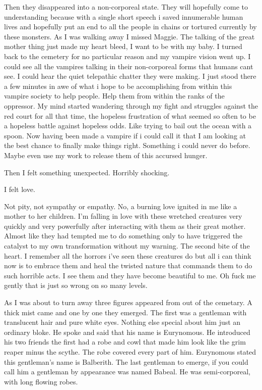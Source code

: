 Then they disappeared into a non-corporeal state. They will hopefully come to understanding because with a single short speech i saved innumerable human lives and hopefully put an end to all the people in chains or tortured currently by these monsters. As I was walking away I missed Maggie. The talking of the great mother thing just made my heart bleed, I want to be with my baby. I turned back to the cemetery for no particular reason and my vampire vision went up. I could see all the vampires talking in their non-corporeal forms that humans cant see. I could hear the quiet telepathic chatter they were making. I just stood there a few minutes in awe of what i hope to be accomplishing from within this vampire society to help people. Help them from within the ranks of the oppressor. My mind started wandering through my fight and struggles against the red court for all that time, the hopeless frustration of what seemed so often to be a hopeless battle against hopeless odds. Like trying to bail out the ocean with a spoon. Now having been made a vampire if i could call it that I am looking at the best chance to finally make things right. Something i could never do before. Maybe even use my work to release them of this accursed hunger.\\
\bigskip

Then I felt something unexpected. Horribly shocking.\\
\bigskip

I felt love.\\
\bigskip

Not pity, not sympathy or empathy. No, a burning love ignited in me like a mother to her children. I'm falling in love with these wretched creatures very quickly and very powerfully after interacting with them as their great mother. Almost like they had tempted me to do something only to have triggered the catalyst to my own transformation without my warning. The second bite of the heart. I remember all the horrors i've seen these creatures do but all i can think now is to embrace them and heal the twisted nature that commands them to do such horrible acts. I see them and they have become beautiful to me. Oh fuck me gently that is just so wrong on so many levels.

As I was about to turn away three figures appeared from out of the cemetary. A thick mist came and one by one they emerged. The first was a gentleman with translucent hair and pure white eyes. Nothing else special about him just an ordinary bloke. He spoke and said that his name is Eurynomous. He introduced his two friends the first had a robe and cowl that made him look like the grim reaper minus the scythe. The robe covered every part of him. Eurynomous stated this gentleman's name is Balberith. The last gentleman to emerge, if you could call him a gentleman by appearance was named Babeal. He was semi-corporeal, with long flowing robes.


